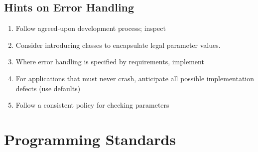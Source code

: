 \documentclass{report}
\begin{document}
			\subsection{Hints on Error Handling}
				\begin{enumerate}
					\item Follow agreed-upon development process; inspect
					\item Consider introducing classes to encapsulate legal parameter values.
					\item Where error handling is specified by requirements, implement
					\item For applications that must never crash, anticipate all possible implementation defects (use defaults)
					\item Follow a consistent policy for checking parameters
				\end{enumerate}
		\section{Programming Standards}
\end{document}
